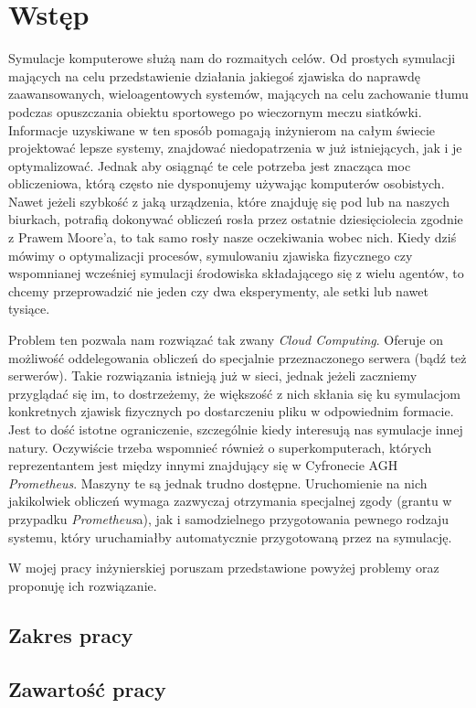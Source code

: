 \newcommand{\prometheusAgh}{\emph{Prometheus}}

\chapter{Wstęp}
\label{cha:wstęp}
Symulacje komputerowe służą nam do rozmaitych celów. Od prostych symulacji mających na celu przedstawienie działania jakiegoś zjawiska do naprawdę zaawansowanych, wieloagentowych systemów, mających na celu zachowanie tłumu podczas opuszczania obiektu sportowego po wieczornym meczu siatkówki. Informacje uzyskiwane w ten sposób pomagają inżynierom na całym świecie projektować lepsze systemy, znajdować niedopatrzenia w już istniejących, jak i je optymalizować. Jednak aby osiągnąć te cele potrzeba jest znacząca moc obliczeniowa, którą często nie dysponujemy używając komputerów osobistych. Nawet jeżeli szybkość z jaką urządzenia, które znajduję się pod lub na naszych biurkach, potrafią dokonywać obliczeń rosła przez ostatnie dziesięciolecia zgodnie z Prawem Moore'a, to tak samo rosły nasze oczekiwania wobec nich. Kiedy dziś mówimy o optymalizacji procesów, symulowaniu zjawiska fizycznego czy wspomnianej wcześniej symulacji środowiska składającego się z wielu agentów, to chcemy przeprowadzić nie jeden czy dwa eksperymenty, ale setki lub nawet tysiące.
\par
Problem ten pozwala nam rozwiązać tak zwany \emph{Cloud Computing}. Oferuje on możliwość oddelegowania obliczeń do specjalnie przeznaczonego serwera (bądź też serwerów). Takie rozwiązania istnieją już w sieci, jednak jeżeli zaczniemy przyglądać się im, to dostrzeżemy, że większość z nich skłania się ku symulacjom konkretnych zjawisk fizycznych po dostarczeniu pliku w odpowiednim formacie. Jest to dość istotne ograniczenie, szczególnie kiedy interesują nas symulacje innej natury. Oczywiście trzeba wspomnieć również o superkomputerach, których reprezentantem jest między innymi znajdujący się w Cyfronecie AGH \prometheusAgh. Maszyny te są jednak trudno dostępne. Uruchomienie na nich jakikolwiek obliczeń wymaga zazwyczaj otrzymania specjalnej zgody (grantu w przypadku \prometheusAgh a), jak i samodzielnego przygotowania pewnego rodzaju systemu, który uruchamiałby automatycznie przygotowaną przez na symulację.
\par
W mojej pracy inżynierskiej poruszam przedstawione powyżej problemy oraz proponuję ich rozwiązanie.


\section{Zakres pracy}
\label{sec:zakresPracy}



\section{Zawartość pracy}
\label{sec:zawartoscPracy}

